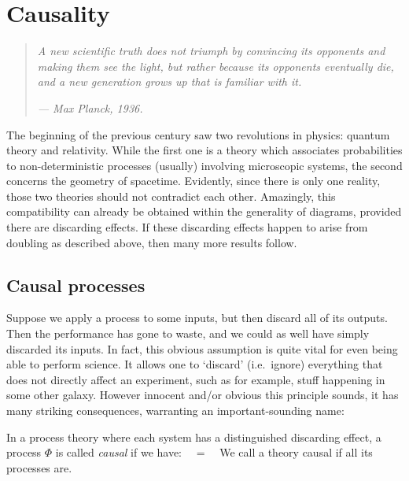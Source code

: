 \documentclass[12pt]{article}
\begin{document}

\section{Causality}\label{sec:causality}
  
\begin{quote}
\em A new scientific truth does not triumph by convincing its opponents and making them see the light, but rather because its opponents eventually die, and a new generation grows up that is familiar with it.  
\par \em \hfill    --- Max Planck, 1936.      
\end{quote}

\noindent
The beginning of the previous century saw two revolutions in physics: quantum theory and relativity. While the first one is a  theory which associates probabilities to non-deterministic processes (usually) involving microscopic systems, the second concerns the geometry of spacetime. Evidently, since there is only one reality, those two theories should not contradict each other. Amazingly, this compatibility can already be obtained within the generality of diagrams, provided there are discarding effects. If  these discarding  effects happen to arise from doubling as described above, then many more results follow.

\subsection{Causal processes}

Suppose we apply  a process to some inputs, but then discard all of its outputs.  Then the performance has gone to waste, and we could as well  have simply discarded its inputs.  In fact, this obvious assumption is quite vital for even being able to perform science.  It allows one to `discard'  (i.e.~ignore) everything that does not directly affect an experiment,  such as for example,  stuff happening in  some other galaxy. However innocent and/or obvious this principle sounds, it has many striking consequences,  warranting an important-sounding name:

\begin{definition}\label{def:eq:causqmaps}
In a process theory where each system  has a  distinguished discarding effect, a process ${\Phi}$ is called \textit{causal} if we have: 
\beq\label{eq:causqmaps}
\ \ = \ \, \discard
\eeq
We call a theory causal if all its processes are.
\end{definition}
\end{document}
